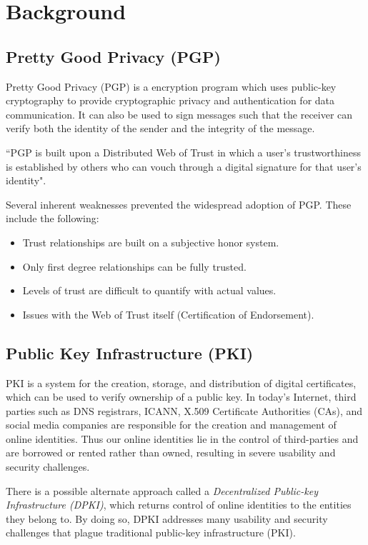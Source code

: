 \chapter{Background}\label{chapter::background}

\section{Pretty Good Privacy (PGP)}
	Pretty Good Privacy (PGP) is a encryption program which uses public-key cryptography\cite{stallings1999cryptography} to provide cryptographic privacy and authentication for data communication. It can also be used to sign messages such that the receiver can verify both the identity of the sender and the integrity of the message.
	
	``PGP is built upon a Distributed Web of Trust in which a user's trustworthiness is established by others who can vouch through a digital signature for that user's identity"\cite{wilson2015pretty}.
	
	Several inherent weaknesses prevented the widespread adoption of PGP. These include the following\cite{wilson2015pretty}:
	\begin{itemize}
		\item Trust relationships are built on a subjective honor system.
		\item Only first degree relationships can be fully trusted.
		\item Levels of trust are difficult to quantify with actual values.
		\item Issues with the Web of Trust itself (Certification of Endorsement).
	\end{itemize}
	
\section{Public Key Infrastructure (PKI)}
	PKI is a system for the creation, storage, and distribution of digital certificates, which can be used to verify ownership of a public key\cite{weise2001public}. In today's Internet, third parties such as DNS registrars, ICANN, X.509 Certificate Authorities (CAs), and social media companies are responsible for the creation and management of online identities. Thus our online identities lie in the control of third-parties and are borrowed or rented rather than owned, resulting in severe usability and security challenges\cite{allen2015decentralized}.
	
	There is a possible alternate approach called a \textit{Decentralized Public-key Infrastructure (DPKI)}, which returns control of online identities to the entities they belong to. By doing so, DPKI addresses many usability and security challenges that plague traditional public-key infrastructure (PKI)\cite{allen2015decentralized}.
	

